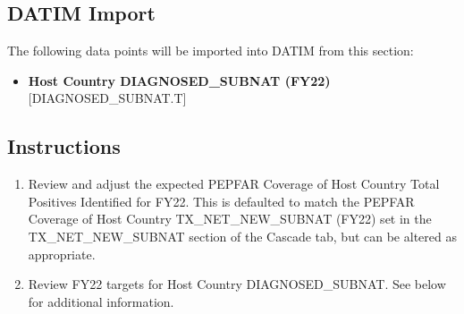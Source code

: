\documentclass[
  openany]{book}
\providecommand{\tightlist}{%
  \setlength{\itemsep}{0pt}\setlength{\parskip}{0pt}}
\begin{document}
\begin{table}[H]
\centering\begingroup\fontsize{12}{14}\selectfont

\endgroup{}
\end{table}

\hypertarget{datim-import-8}{%
\subsection{DATIM Import}\label{datim-import-8}}

The following data points will be imported into DATIM from this section:

\begin{itemize}
\tightlist
\item
  \textbf{Host Country DIAGNOSED\_SUBNAT (FY22)} {[}DIAGNOSED\_SUBNAT.T{]}
\end{itemize}

\hypertarget{instructions-8}{%
\subsection{Instructions}\label{instructions-8}}

\begin{enumerate}
\def\labelenumi{\arabic{enumi}.}
\item
  Review and adjust the expected PEPFAR Coverage of Host Country Total
  Positives Identified for FY22. This is defaulted to match the PEPFAR
  Coverage of Host Country TX\_NET\_NEW\_SUBNAT (FY22) set in the
  TX\_NET\_NEW\_SUBNAT section of the Cascade tab, but can be altered as
  appropriate.
\item
  Review FY22 targets for Host Country DIAGNOSED\_SUBNAT. See below for
  additional information.
\end{enumerate}
\end{document}
